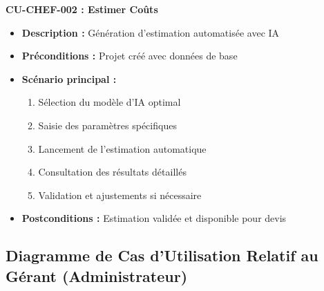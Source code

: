 \textbf{CU-CHEF-002 : Estimer Coûts}
\begin{itemize}
    \item \textbf{Description :} Génération d'estimation automatisée avec IA
    \item \textbf{Préconditions :} Projet créé avec données de base
    \item \textbf{Scénario principal :}
    \begin{enumerate}
        \item Sélection du modèle d'IA optimal
        \item Saisie des paramètres spécifiques
        \item Lancement de l'estimation automatique
        \item Consultation des résultats détaillés
        \item Validation et ajustements si nécessaire
    \end{enumerate}
    \item \textbf{Postconditions :} Estimation validée et disponible pour devis
\end{itemize}


\subsection{Diagramme de Cas d'Utilisation Relatif au Gérant (Administrateur)}

